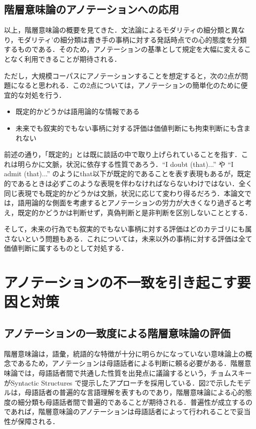 \documentclass[japanese]{jnlp_1.4}
\begin{document}
\subsection{階層意味論のアノテーションへの応用}

以上，階層意味論の概要を見てきた．文法論によるモダリティの細分類と異なり，モダリティ’の細分類は書き手の事柄に対する発話時点での心的態度を分類するものである．そのため，アノテーションの基準として規定を大幅に変えることなく利用できることが期待される．

ただし，大規模コーパスにアノテーションすることを想定すると，次の2点が問題になると思われる．この2点については，アノテーションの簡単化のために便宜的な対処を行う．
\begin{itemize}
\item 既定的かどうかは語用論的な情報である
\item 未来でも叙実的でもない事柄に対する評価は価値判断にも拘束判断にも含まれない
\end{itemize}
前述の通り，「既定的」とは既に談話の中で取り上げられていることを指す．これは明らかに文脈，状況に依存する性質であろう．``I doubt (that)...'' や ``I admit (that)...'' のようにthat以下が既定的であることを表す表現もあるが，既定的であるときは必ずこのような表現を伴わなければならないわけではない．全く同じ表現でも既定的かどうかは文脈，状況に応じて変わり得るだろう．本論文では，語用論的な側面を考慮するとアノテーションの労力が大きくなり過ぎると考え，既定的かどうかは判断せず，真偽判断と是非判断を区別しないこととする．

そして，未来の行為でも叙実的でもない事柄に対する評価はどのカテゴリにも属さないという問題もある．これについては，未来以外の事柄に対する評価は全て価値判断に属するものとして対処する．




\section{アノテーションの不一致を引き起こす要因と対策}

\subsection{アノテーションの一致度による階層意味論の評価}

階層意味論は，語彙，統語的な特徴が十分に明らかになっていない意味論上の概念であるため，アノテーションは母語話者による判断に頼る必要がある．階層意味論では，母語話者間で共通した性質を出発点に議論するという，チョムスキーがSyntactic Structures \cite{Book_22}で提示したアプローチを採用している\cite{Book_13}．図2で示したモデルは，母語話者の普遍的な言語理解を表すものであり，階層意味論による心的態度の細分類も母語話者間で普遍的であることが期待される．普遍性が成立するのであれば，階層意味論のアノテーションは母語話者によって行われることで妥当性が保障される．
\end{document}
